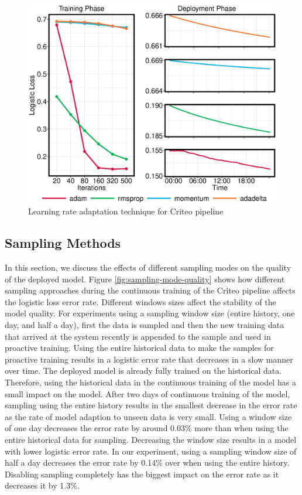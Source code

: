 \begin{figure}[h!]
\includegraphics[width=\columnwidth]{../images/experiment-results/criteo-learning-rate-experiment.eps}
\caption{Learning rate adaptation technique for Criteo pipeline}
\label{fig:criteo-learning-rate}
\end{figure}

\subsection{Sampling Methods}
In this section, we discuss the effects of different sampling modes on the quality of the deployed model.
Figure \ref{fig:sampling-mode-quality} shows how different sampling approaches during the continuous training of the Criteo pipeline affects the logistic loss error rate.
Different windows sizes affect the stability of the model quality.
For experiments using a sampling window size (entire history, one day, and half a day), first the data is sampled and then the new training data that arrived at the system recently is appended to the sample and used in proactive training.
Using the entire historical data to make the samples for proactive training results in a logistic error rate that decreases in a slow manner over time.
The deployed model is already fully trained on the historical data.
Therefore, using the historical data in the continuous training of the model has a small impact on the model.
After two days of continuous training of the model, sampling using the entire history results in the smallest decrease in the error rate as the rate of model adaption to unseen data is very small.
Using a window size of one day decreases the error rate by around 0.03\% more than when using the entire historical data for sampling.
Decreasing the window size results in a model with lower logistic error rate.
In our experiment, using a sampling window size of half a day decreases the error rate by 0.14\% over when using the entire history.
Disabling sampling completely has the biggest impact on the error rate as it decreases it by 1.3\%.

